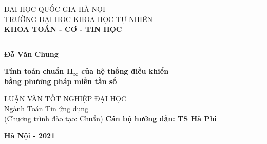 \begin{titlepage}


\begin{center}
	{\fontsize{14pt}{15.6}\selectfont
		ĐẠI HỌC QUỐC GIA HÀ NỘI \\
		TRƯỜNG ĐẠI HỌC KHOA HỌC TỰ NHIÊN\\}
	\medspace
	{\fontsize{13pt}{15.6}\selectfont
		\textbf{KHOA TOÁN - CƠ - TIN HỌC}}
	
	\rule{7.25cm}{1pt}
	
	\vfill
	{\fontsize{14}{15.6}\selectfont \textbf{Đỗ Văn Chung}}
	\vfill
	
	{\fontsize{18}{20}\selectfont \textbf{Tính toán chuẩn H$_\infty$ của hệ thống điều khiển \\ bằng phương pháp miền tần số}}
	\vfill
	
	{\fontsize{14}{15.6}\selectfont 
		LUẬN VĂN TỐT NGHIỆP ĐẠI HỌC\\
		\vspace{1cm}
		Ngành Toán Tin ứng dụng\\
		(Chương trình đào tạo: Chuẩn)
	}
	\vfill
	{\fontsize{14}{15.6}\selectfont \textbf{Cán bộ hướng dẫn: TS Hà Phi}}
	
	\vfill
	{\fontsize{14}{15.6}\selectfont \textbf{Hà Nội - 2021}}
\end{center}
\end{titlepage}